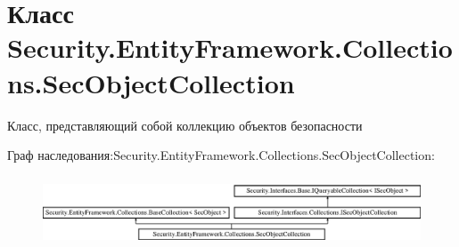 \hypertarget{class_security_1_1_entity_framework_1_1_collections_1_1_sec_object_collection}{}\section{Класс Security.\+Entity\+Framework.\+Collections.\+Sec\+Object\+Collection}
\label{class_security_1_1_entity_framework_1_1_collections_1_1_sec_object_collection}


Класс, представляющий собой коллекцию объектов безопасности  


Граф наследования\+:Security.\+Entity\+Framework.\+Collections.\+Sec\+Object\+Collection\+:\begin{figure}[H]
\begin{center}
\leavevmode
\includegraphics[height=2.089552cm]{df/d20/class_security_1_1_entity_framework_1_1_collections_1_1_sec_object_collection}
\end{center}
\end{figure}
